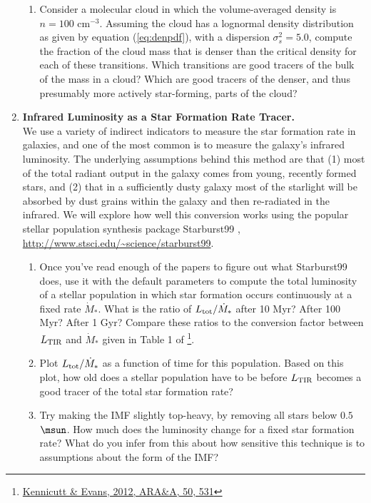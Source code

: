 \begin{enumerate}
\begin{enumerate}
\item Consider a molecular cloud in which the volume-averaged density is $n=100$ cm$^{-3}$. Assuming the cloud has a lognormal density distribution as given by equation (\ref{eq:denpdf}), with a dispersion $\sigma_s^2 = 5.0$, compute the fraction of the cloud mass that is denser than the critical density for each of these transitions. Which transitions are good tracers of the bulk of the mass in a cloud? Which are good tracers of the denser, and thus presumably more actively star-forming, parts of the cloud?
\end{enumerate} 

\vspace{0.2in}

\item \textbf{Infrared Luminosity as a Star Formation Rate Tracer.}\\
We use a variety of indirect indicators to measure the star formation rate in galaxies, and one of the most common is to measure the galaxy's infrared luminosity. The underlying assumptions behind this method are that (1) most of the total radiant output in the galaxy comes from young, recently formed stars, and (2) that in a sufficiently dusty galaxy most of the starlight will be absorbed by dust grains within the galaxy and then re-radiated in the infrared. We will explore how well this conversion works using the popular stellar population synthesis package Starburst99 \citep{leitherer99a, vazquez05a}, \url{http://www.stsci.edu/~science/starburst99}.
\begin{enumerate}
\item Once you've read enough of the papers to figure out what Starburst99 does, use it with the default parameters to compute the total luminosity of a stellar population in which star formation occurs continuously at a fixed rate $\dot{M}_*$. What is the ratio of $L_{\rm tot}/\dot{M}_*$ after 10 Myr? After 100 Myr? After 1 Gyr? Compare these ratios to the conversion factor between $L_{\rm TIR}$ and $\dot{M}_*$ given in Table 1 of \citet{kennicutt12a}\footnote{\href{http://adsabs.harvard.edu/abs/2012ARA\%26A..50..531K}{Kennicutt \& Evans, 2012, ARA\&A, 50, 531}}.
\item Plot $L_{\rm tot}/\dot{M}_*$ as a function of time for this population. Based on this plot, how old does a stellar population have to be before $L_{\rm TIR}$ becomes a good tracer of the total star formation rate?
\item Try making the IMF slightly top-heavy, by removing all stars below $0.5$ $\msun$. How much does the luminosity change for a fixed star formation rate? What do you infer from this about how sensitive this technique is to assumptions about the form of the IMF?
\end{enumerate}

\end{enumerate}
